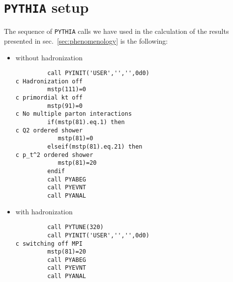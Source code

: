 \documentclass[paper]{JHEP3}
\newcommand\PYTHIA{{\tt PYTHIA}}
\begin{document}
\section{\PYTHIA{} setup}
\label{app:PY_setup}
The sequence of \PYTHIA{} calls we have used in the calculation of the
results presented in sec.~\ref{sec:phenomenology} is the following:
\begin{itemize}
\item  without hadronization
\begin{verbatim}
         call PYINIT('USER','','',0d0)
c Hadronization off
         mstp(111)=0
c primordial kt off
         mstp(91)=0
c No multiple parton interactions
         if(mstp(81).eq.1) then
c Q2 ordered shower
            mstp(81)=0
         elseif(mstp(81).eq.21) then
c p_t^2 ordered shower
            mstp(81)=20
         endif
         call PYABEG
         call PYEVNT
         call PYANAL
\end{verbatim}

\item with hadronization 
\begin{verbatim}
         call PYTUNE(320)
         call PYINIT('USER','','',0d0)
c switching off MPI
         mstp(81)=20
         call PYABEG
         call PYEVNT
         call PYANAL
\end{verbatim}
\end{itemize}


\end{document}
